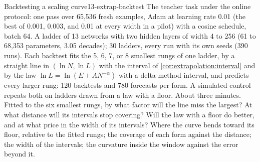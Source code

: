 \begin{refsection}
\begin{lab}{Backtesting a scaling curve}{13-extrap-backtest}\label{lab:extrapolation:backtest}
 The teacher task under the online protocol: one pass over 65,536 fresh examples, Adam at learning rate 0.01 (the best of 0.001, 0.003, and 0.01 at every width in a pilot) with a cosine schedule, batch 64. A ladder of 13 networks with two hidden layers of width 4 to 256 (61 to 68,353 parameters, 3.05 decades); 30 ladders, every run with its own seeds (390 runs). Each backtest fits the 5, 6, 7, or 8 smallest rungs of one ladder, by a straight line in $(\ln N,\ln L)$ with the interval of \cref{cor:extrapolation:interval} and by the law $\ln L=\ln(E+AN^{-\alpha})$ with a delta-method interval, and predicts every larger rung: 120 backtests and 780 forecasts per form. A simulated control repeats both on ladders drawn from a law with a floor. About three minutes.
 Fitted to the six smallest rungs, by what factor will the line miss the largest? At what distance will its intervals stop covering? Will the law with a floor do better, and at what price in the width of its intervals?
 Where the curve bends toward its floor, relative to the fitted rungs; the coverage of each form against the distance; the width of the intervals; the curvature inside the window against the error beyond it.
\end{lab}


\end{refsection}
